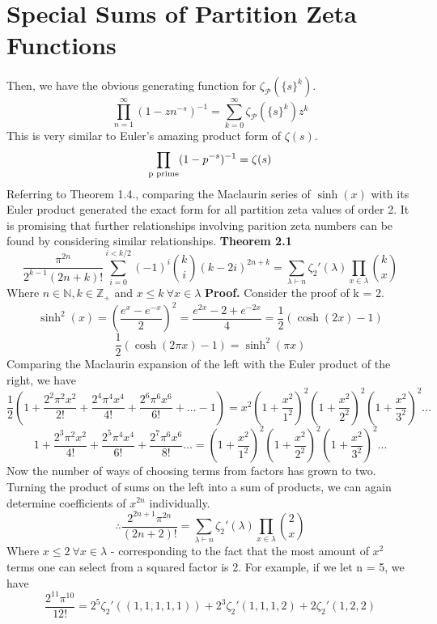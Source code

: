 \documentclass[12pt]{article}
\begin{document}
\section{Special Sums of Partition Zeta Functions}
Then, we have the obvious generating function for \(\zeta_{\mathcal{P}}(\{s\}^k)\).\cite{Schneider_2020}
\[\prod_{n=1}^{\infty}(1-zn^{-s})^{-1}=\sum_{k=0}^{\infty}\zeta_{\mathcal{P}}(\{s\}^k)z^k\]
This is very similar to Euler's amazing product form of \(\zeta(s)\).
\[\prod_{\textup{p prime}}(1-p^{-s})^{-1} = \zeta(s)\]
Referring to Theorem 1.4., comparing the Maclaurin series of \(\sinh(x)\) with its Euler product generated the exact form for all partition zeta values of order 2. It is promising that further relationships involving parition zeta numbers can be found by considering similar relationships.
\newline
\textbf{Theorem 2.1}
\[\frac{\pi^{2n}}{2^{k-1}(2n+k)!}\sum_{i=0}^{i<k/2}(-1)^i\binom{k}{i}(k-2i)^{2n+k}=\sum_{
\lambda \vdash n}\zeta_2'(\lambda)\prod_{x \in \lambda}\binom{k}{x}\]
Where \(n \in \mathbb{N},k \in \mathbb{Z}_+\) and \(x \leq k\ \forall x \in \lambda\)
\newline
\textbf{Proof.}
Consider the proof of k = 2.
\[\sinh^2(x) = \left(\frac{e^x - e^{-x}}{2}\right)^2 = \frac{e^{2x}-2+e^{-2x}}{4} = \frac{1}{2}(\cosh(2x) - 1)\]
\[\frac{1}{2}(\cosh(2\pi x) - 1) = \sinh^2(\pi x)\]
Comparing the Maclaurin expansion of the left with the Euler product of the right, we have
\[\frac{1}{2}\left(1+\frac{2^2\pi^2x^2}{2!}+\frac{2^4\pi^4x^4}{4!}+\frac{2^6\pi^6x^6}{6!}+...-1\right) = x^2\left(1+\frac{x^2}{1^2}\right)^2\left(1+\frac{x^2}{2^2}\right)^2\left(1+\frac{x^2}{3^2}\right)^2...\]
\[1 + \frac{2^3\pi^2x^2}{4!} + \frac{2^5\pi^4x^4}{6!} + \frac{2^7\pi^6x^6}{8!}... = \left(1+\frac{x^2}{1^2}\right)^2\left(1+\frac{x^2}{2^2}\right)^2\left(1+\frac{x^2}{3^2}\right)^2...\]
Now the number of ways of choosing terms from factors has grown to two. Turning the product of sums on the left into a sum of products, we can again determine coefficients of \(x^{2n}\) individually.
\[\therefore \frac{2^{2n+1}\pi^{2n}}{(2n+2)!} = \sum_{\lambda \vdash n}\zeta_2'(\lambda)\prod_{x \in \lambda}\binom{2}{x}\]
Where \(x \leq 2\ \forall x \in \lambda\) - corresponding to the fact that the most amount of \(x^2\) terms one can select from a squared factor is 2. For example, if we let n = 5, we have
\[\frac{2^{11}\pi^{10}}{12!}=2^5\zeta_2'((1,1,1,1,1))+2^3\zeta_2'(1,1,1,2)+2\zeta_2'(1,2,2)\]
\end{document}

